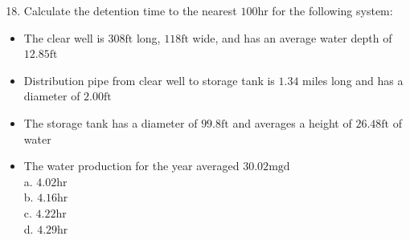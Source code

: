 \documentclass[10pt]{article}
\begin{document}
\begin{enumerate}
  \setcounter{enumi}{17}
  \item Calculate the detention time to the nearest $100 \mathrm{hr}$ for the following system:
\end{enumerate}

\begin{itemize}
  \item The clear well is $308 \mathrm{ft}$ long, $118 \mathrm{ft}$ wide, and has an average water depth of $12.85 \mathrm{ft}$

  \item Distribution pipe from clear well to storage tank is $1.34$ miles long and has a diameter of $2.00 \mathrm{ft}$

  \item The storage tank has a diameter of $99.8 \mathrm{ft}$ and averages a height of $26.48 \mathrm{ft}$ of water

  \item The water production for the year averaged $30.02 \mathrm{mgd}$\\
a. $4.02 \mathrm{hr}$\\
b. $4.16 \mathrm{hr}$\\
c. $4.22 \mathrm{hr}$\\
d. $4.29 \mathrm{hr}$

\end{itemize}
\end{document}
